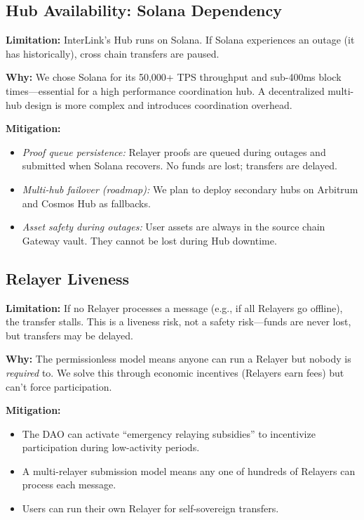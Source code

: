 \documentclass[11pt,a4paper]{article}
\begin{document}
\subsection{Hub Availability: Solana Dependency}

\textbf{Limitation:} InterLink's Hub runs on Solana. If Solana experiences an outage (it has historically), cross chain transfers are paused.

\textbf{Why:} We chose Solana for its 50,000+ TPS throughput and sub-400ms block times---essential for a high performance coordination hub. A decentralized multi-hub design is more complex and introduces coordination overhead.

\textbf{Mitigation:}
\begin{itemize}
    \item \textit{Proof queue persistence:} Relayer proofs are queued during outages and submitted when Solana recovers. No funds are lost; transfers are delayed.
    \item \textit{Multi-hub failover (roadmap):} We plan to deploy secondary hubs on Arbitrum and Cosmos Hub as fallbacks.
    \item \textit{Asset safety during outages:} User assets are always in the source chain Gateway vault. They cannot be lost during Hub downtime.
\end{itemize}

\subsection{Relayer Liveness}

\textbf{Limitation:} If no Relayer processes a message (e.g., if all Relayers go offline), the transfer stalls. This is a liveness risk, not a safety risk---funds are never lost, but transfers may be delayed.

\textbf{Why:} The permissionless model means anyone can run a Relayer but nobody is \textit{required} to. We solve this through economic incentives (Relayers earn fees) but can't force participation.

\textbf{Mitigation:}
\begin{itemize}
    \item The DAO can activate ``emergency relaying subsidies'' to incentivize participation during low-activity periods.
    \item A multi-relayer submission model means any one of hundreds of Relayers can process each message.
    \item Users can run their own Relayer for self-sovereign transfers.
\end{itemize}
\end{document}
